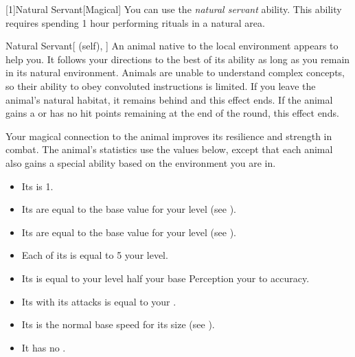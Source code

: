         [1]{Natural Servant}[Magical]
        You can use the \textit{natural servant} ability.
        This ability requires spending 1 hour performing rituals in a natural area.
        \begin{attuneability}{Natural Servant}[ (self), ]
            An animal native to the local environment appears to help you.
            It follows your directions to the best of its ability as long as you remain in its natural environment.
            Animals are unable to understand complex concepts, so their ability to obey convoluted instructions is limited.
            If you leave the animal's natural habitat, it remains behind and this effect ends.
            If the animal gains a  or has no hit points remaining at the end of the round, this effect ends.

            Your magical connection to the animal improves its resilience and strength in combat.
            The animal's statistics use the values below, except that each animal also gains a special ability based on the environment you are in.
            \begin{itemize}
                \item Its  is 1.
                \item Its  are equal to the base value for your level (see ).
                \item Its  are equal to the base value for your level (see ).
                \item Each of its  is equal to 5 \add your level.
                \item Its  is equal to your level \add half your base Perception \add your  to accuracy.
                \item Its  with its attacks is equal to your  .
                \item Its  is the normal base speed for its size (see ).
                \item It has no .
            \end{itemize}
        \end{attuneability}

